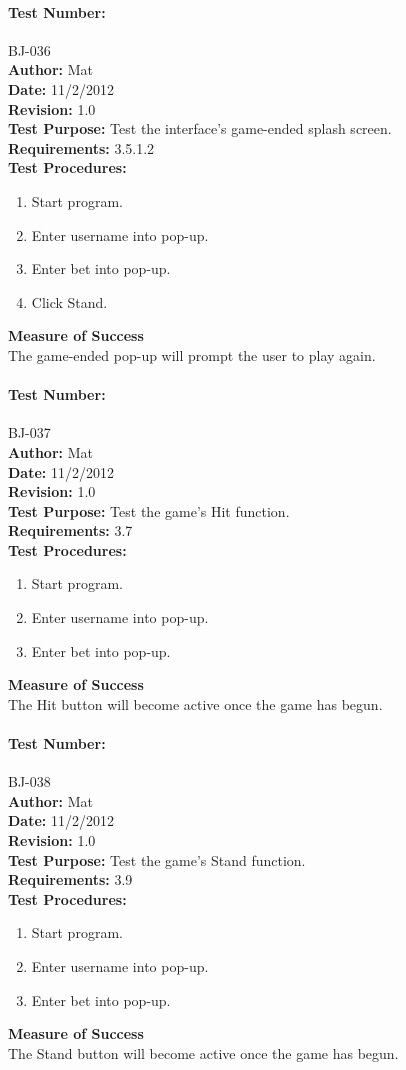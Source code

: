 \documentclass{article}
\begin{document}
\paragraph{Test Number:} BJ-036\\
\textbf{Author:} Mat\\
\textbf{Date:} 11/2/2012\\
\textbf{Revision:} 1.0\\
\textbf{Test Purpose:} Test the interface's game-ended splash screen.\\
\textbf{Requirements:} 3.5.1.2 \\
\textbf{Test Procedures:} 
\begin{enumerate}
\item Start program.
\item Enter username into pop-up.
\item Enter bet into pop-up.
\item Click Stand.
\end{enumerate}
\textbf{Measure of Success}\\The game-ended pop-up will prompt the user to play again.
\paragraph{Test Number:} BJ-037\\
\textbf{Author:} Mat\\
\textbf{Date:} 11/2/2012\\
\textbf{Revision:} 1.0\\
\textbf{Test Purpose:} Test the game's Hit function.\\
\textbf{Requirements:} 3.7 \\
\textbf{Test Procedures:} 
\begin{enumerate}
\item Start program.
\item Enter username into pop-up.
\item Enter bet into pop-up.
\end{enumerate}
\textbf{Measure of Success}\\The Hit button will become active once the game has begun.
\paragraph{Test Number:} BJ-038\\
\textbf{Author:} Mat\\
\textbf{Date:} 11/2/2012\\
\textbf{Revision:} 1.0\\
\textbf{Test Purpose:} Test the game's Stand function.\\
\textbf{Requirements:} 3.9 \\
\textbf{Test Procedures:} 
\begin{enumerate}
\item Start program.
\item Enter username into pop-up.
\item Enter bet into pop-up.
\end{enumerate}
\textbf{Measure of Success}\\The Stand button will become active once the game has begun.
\end{document}
